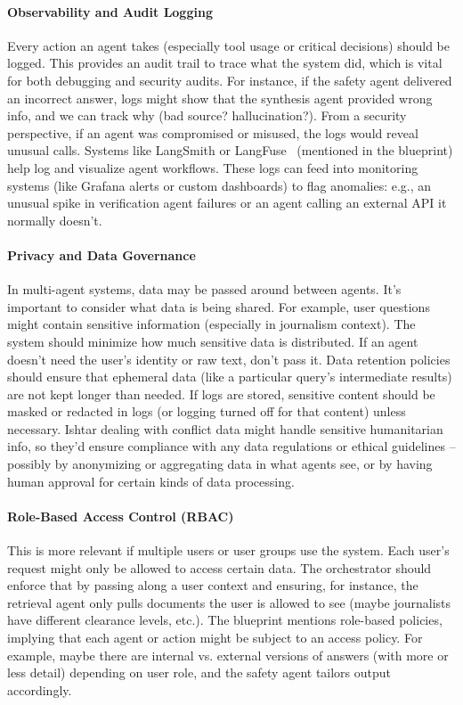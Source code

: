 \paragraph*{Observability and Audit Logging}
Every action an agent takes (especially tool usage or critical decisions) should be logged. This provides an audit trail to trace what the system did, which is vital for both debugging and security audits. For instance, if the safety agent delivered an incorrect answer, logs might show that the synthesis agent provided wrong info, and we can track why (bad source? hallucination?). From a security perspective, if an agent was compromised or misused, the logs would reveal unusual calls. Systems like LangSmith or LangFuse~\cite{langfuse_obs_overview} (mentioned in the blueprint) help log and visualize agent workflows. These logs can feed into monitoring systems (like Grafana alerts or custom dashboards) to flag anomalies: e.g., an unusual spike in verification agent failures or an agent calling an external API it normally doesn’t.

\paragraph*{Privacy and Data Governance}
In multi-agent systems, data may be passed around between agents. It’s important to consider what data is being shared. For example, user questions might contain sensitive information (especially in journalism context). The system should minimize how much sensitive data is distributed. If an agent doesn’t need the user’s identity or raw text, don’t pass it. Data retention policies should ensure that ephemeral data (like a particular query’s intermediate results) are not kept longer than needed. If logs are stored, sensitive content should be masked or redacted in logs (or logging turned off for that content) unless necessary. Ishtar dealing with conflict data might handle sensitive humanitarian info, so they’d ensure compliance with any data regulations or ethical guidelines – possibly by anonymizing or aggregating data in what agents see, or by having human approval for certain kinds of data processing.

\paragraph*{Role-Based Access Control (RBAC)}
This is more relevant if multiple users or user groups use the system. Each user's request might only be allowed to access certain data. The orchestrator should enforce that by passing along a user context and ensuring, for instance, the retrieval agent only pulls documents the user is allowed to see (maybe journalists have different clearance levels, etc.). The blueprint mentions role-based policies, implying that each agent or action might be subject to an access policy. For example, maybe there are internal vs. external versions of answers (with more or less detail) depending on user role, and the safety agent tailors output accordingly.

